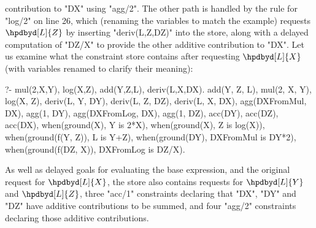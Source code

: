 contribution to "DX" using "agg/2". The other path is handled by the rule
for "log/2" on line 26, which (renaming the variables to match the example) requests
$\hpdbyd[L]{Z}$ by inserting "deriv(L,Z,DZ)" into the store, along with a delayed computation
of "DZ/X" to provide the other additive contribution to "DX". Let us examine what the constraint
store contains after requesting $\hpdbyd[L]{X}$ (with variables renamed to clarify their
meaning):
\begin{prolog-barred}
	?- mul(2,X,Y), log(X,Z), add(Y,Z,L), deriv(L,X,DX).
	add(Y, Z, L),
	mul(2, X, Y),
	log(X, Z),
	deriv(L, Y, DY),
	deriv(L, Z, DZ),
	deriv(L, X, DX),
	agg(DXFromMul, DX),
	agg(1, DY),
	agg(DXFromLog, DX),
	agg(1, DZ),
	acc(DY), acc(DZ), acc(DX),
	when(ground(X), Y is 2*X),
	when(ground(X), Z is log(X)),
	when(ground(f(Y, Z)), L is Y+Z),
	when(ground(DY), DXFromMul is DY*2),
	when(ground(f(DZ, X)), DXFromLog is DZ/X).
\end{prolog-barred}
As well as delayed goals for evaluating the base expression, and the original
request for $\hpdbyd[L]{X}$, the store also
contains requests for $\hpdbyd[L]{Y}$ and $\hpdbyd[L]{Z}$, three "acc/1" constraints
declaring that "DX", "DY" and "DZ" have additive contributions to be summed,
and four "agg/2" constraints declaring those additive contributions.

